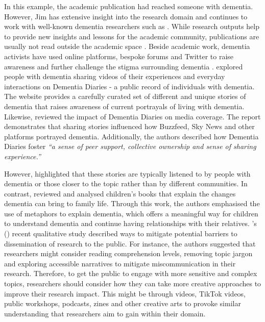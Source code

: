 In this example, the academic publication had reached someone with dementia. However, Jim has extensive insight into the research domain and continues to work with well-known dementia researchers such as \citeauthor{bartlett2010broadening}. While research outputs help to provide new insights and lessons for the academic community, publications are usually not read outside the academic space \citep{hartley2012new}. Beside academic work, dementia activists have used online platforms, bespoke forums and Twitter to raise awareness and further challenge the stigma surrounding dementia \citep{talbot_how_2020}. \cite{lazar_safe_2019} explored people with dementia sharing videos of their experiences and everyday interactions on Dementia Diaries - a public record of individuals with dementia. The website provides a carefully curated set of different and unique stories of dementia that raises awareness of current portrayals of living with dementia. Likewise, \cite{woodall2016independent} reviewed the impact of Dementia Diaries on media coverage. The report demonstrates that sharing stories influenced how Buzzfeed, Sky News and other platforms portrayed dementia. Additionally, the authors described how Dementia Diaries foster \textit{``a sense of peer support, collective ownership and sense of sharing experience.''}

However, \cite{woodall2016independent} highlighted that these stories are typically listened to by people with dementia or those closer to the topic rather than by different communities. In contrast, \cite{caldwell2021depicting} reviewed and analysed children's books that explain the changes dementia can bring to family life. Through this work, the authors emphasised the use of metaphors to explain dementia, which offers a meaningful way for children to understand dementia and continue having relationships with their relatives. \citeauthor{smith2020disseminating}'s (\citeyear{smith2020disseminating}) recent qualitative study described ways to mitigate potential barriers to dissemination of research to the public. For instance, the authors suggested that researchers might consider reading comprehension levels, removing topic jargon and exploring accessible narratives to mitigate miscommunication in their research. Therefore, to get the public to engage with more sensitive and complex topics, researchers should consider how they can take more creative approaches to improve their research impact. This might be through videos, TikTok videos, public workshops, podcasts, zines and other creative arts to provoke similar understanding that researchers aim to gain within their domain.

